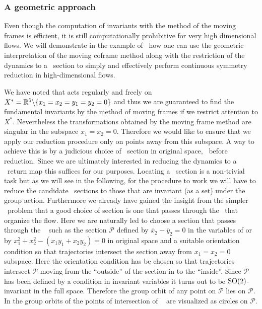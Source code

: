 \subsubsection{A geometric approach}
\label{laserMFnum}

Even though the computation of invariants with the method of
the moving frames is efficient, it is still computationally
prohibitive for very high dimensional flows. We will
demonstrate in the example of \CLe\ how one can use the
geometric interpretation of the moving coframe method along
with the restriction of the dynamics to a \Poincare\ section
to simply and effectively perform continuous symmetry
reduction in high-dimensional flows.

We have noted that  acts regularly and freely on
$X^*=\mathbb{R}^{5}\backslash\{x_1=x_2=y_1=y_2=0\}$ and thus we are
guaranteed to find the fundamental invariants by the method
of moving frames if we restrict attention to $X^*$.
Nevertheless the transformations  obtained
by the moving frame method are singular in the subspace
$x_1=x_2=0$.
Therefore we would like to ensure that we apply our
reduction procedure only on points away from this subspace. A
way to achieve this is by a judicious choice of \Poincare\
section in original space, \ie~before reduction. Since we are
ultimately interested in reducing the dynamics to a
\Poincare\ return map this suffices for our purposes.
Locating a \Poincare\ section is a non-trivial task
but as we will see in the following, for the procedure to
work we will have to reduce the candidate \Poincare\ sections
to those that are invariant (as a set) under the group
action. Furthermore we already have gained the insight from
the simpler \Le\ problem that a good choice of section is one
that passes through the \eqva\ that organize the flow. Here
we are naturally led to choose a section that passes through
the \reqv~ such as the section $\mathcal{P}$
defined by $\overline{x}_2-\overline{y}_2=0$ in the variables
of  or by $x_1^2+x_2^2-(x_1 y_1 + x_2
y_2)=0$ in original space and a suitable orientation
condition so that trajectories intersect the section away
from $x_1=x_2=0$ subspace. Here the orientation condition has
be chosen so that trajectories intersect $\mathcal{P}$ moving
from the ``outside'' of the section in
 to the ``inside''. Since
$\mathcal{P}$ has been defined by a condition in invariant
variables  it turns out to be
$\textrm{SO}(2)$-invariant in the full space. Therefore the group
orbit of any point on $\mathcal{P}$ lies on $\mathcal{P}$. In
 the group orbits of the points of
intersection of \rpo~ are visualized as circles
on $\mathcal{P}$.

